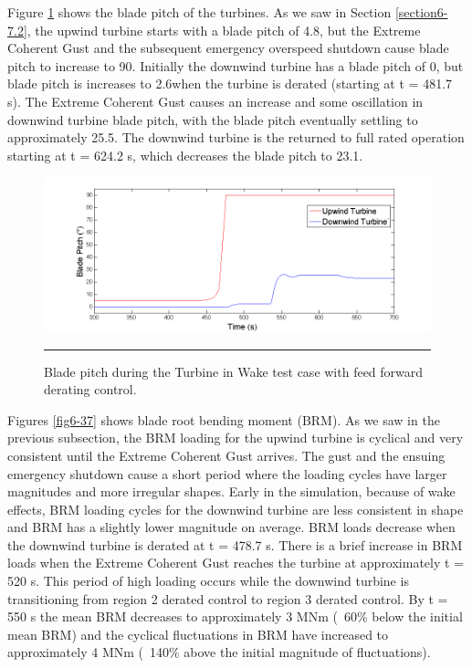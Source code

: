 Figure \ref{fig6-36} shows the blade pitch of the turbines. As we saw in Section \ref{section6-7.2}, the upwind turbine starts with a blade pitch of 4.8\degree, but the Extreme Coherent Gust and the subsequent emergency overspeed shutdown cause blade pitch to increase to 90\degree. Initially the downwind turbine has a blade pitch of 0\degree, but  blade pitch is increases to 2.6\degree when the turbine is derated (starting at t = 481.7 s). The Extreme Coherent Gust causes an increase and some oscillation in downwind turbine blade pitch, with the blade pitch eventually settling to approximately 25.5\degree. The downwind turbine is the returned to full rated operation starting at t = 624.2 s, which decreases the blade pitch to 23.1\degree.

\begin{figure}[htbp] \label{fig6-36}
	\centering
		\includegraphics[trim = {1cm 0 2cm 0}, clip, width = \linewidth]{Figures/ch6Figures/fig6-36.png}
		\rule{35em}{0.5pt}
	\caption{Blade pitch during the Turbine in Wake test case with feed forward derating control.}
\end{figure}

Figures \ref{fig6-37} shows blade root bending moment (BRM). As we saw in the previous subsection, the BRM loading for the upwind turbine is cyclical and very consistent until the Extreme Coherent Gust arrives. The gust and the ensuing emergency shutdown cause a short period where the loading cycles have larger magnitudes and more irregular shapes. Early in the simulation, because of wake effects, BRM loading cycles for the downwind turbine are less consistent in shape and BRM has a slightly lower magnitude on average. BRM loads decrease when the downwind turbine is derated at t = 478.7 s. There is a brief increase in BRM loads when the Extreme Coherent Gust reaches the turbine at approximately t = 520 s. This period of high loading occurs while the downwind turbine is transitioning from region 2 derated control to region 3 derated control. By t = 550 s the mean BRM decreases to approximately 3 MNm (~60\% below the initial mean BRM) and the cyclical fluctuations in BRM have increased to approximately 4 MNm (~140\% above the initial magnitude of fluctuations).

